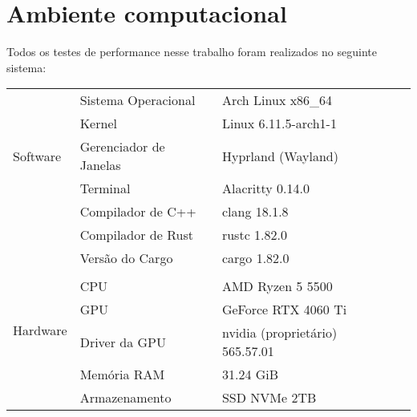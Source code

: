 \chapter{Ambiente computacional}

Todos os testes de performance nesse trabalho foram realizados no seguinte sistema:

\begin{table}[!ht]
	\centering
	\begin{tabular}{llll}
		\toprule
		\multirow{5}{3cm}{Software}
		 & Sistema Operacional    & Arch Linux x86\_64              & \\
		 & Kernel                 & Linux 6.11.5-arch1-1            & \\
		 & Gerenciador de Janelas & Hyprland (Wayland)              & \\
		 & Terminal               & Alacritty 0.14.0                & \\
		 & Compilador de C++      & clang 18.1.8                    & \\
		 & Compilador de Rust     & rustc 1.82.0                    & \\
		 & Versão do Cargo        & cargo 1.82.0                    & \\
		 &                        &                                 & \\
		\multirow{4}{3cm}{Hardware}
		 & CPU                    & AMD Ryzen 5 5500                & \\
		 & GPU                    & GeForce RTX 4060 Ti             & \\
		 & Driver da GPU          & nvidia (proprietário) 565.57.01 & \\
		 & Memória RAM            & 31.24 GiB                       & \\
		 & Armazenamento          & SSD NVMe 2TB                    & \\
		\bottomrule
	\end{tabular}
\end{table}

\noindent